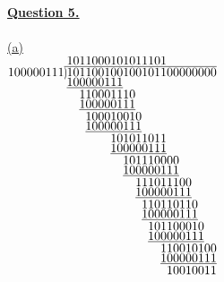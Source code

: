 \documentclass[12pt]{article}
\newcommand\showdiv[1]{\overline{\smash{\hstretch{.5}{)}\mkern-3.2mu\hstretch{.5}{)}}#1}}
\let\ph\phantom
\begin{document}
\hyperlink{toc}{\LARGE \underline{\textbf{Question 5.}}}\\
~\\\hyperlink{toc}{\hypertarget{5.1}{(a)}}\\
%
\(
\setstackgap{S}{1.5pt}
\stackMath\def\stackalignment{r}
\stackunder{%
100000111 \stackon[1pt]{\showdiv{101100100100101100000000}}{1011000101011101\ph{00000000}}%
}{%
\Shortstack[l]{{\underline{100000111}\ph{100101100000000}}
\ph{00}1100011{10} \ph{00}\underline{100000111}
\ph{000}10001001{0} \ph{000}\underline{100000111}
\ph{0000000}10101{1011} \ph{0000000}\underline{100000111}
\ph{000000000}1011100{00} \ph{000000000}\underline{100000111}
\ph{00000000000}1110111{00} \ph{00000000000}\underline{100000111}
\ph{000000000000}11011011{0} \ph{000000000000}\underline{100000111}
\ph{0000000000000}10110001{0} \ph{0000000000000}\underline{100000111}
\ph{000000000000000}1100101{00} \ph{000000000000000}\underline{100000111}
\ph{0000000000000000}10010011
}
}
\)
~\\
\end{document}
